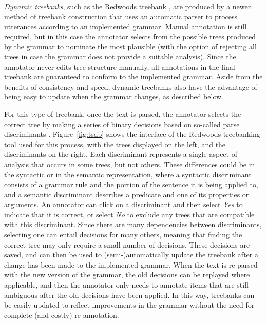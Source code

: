 
\textit{Dynamic treebanks}, such as the Redwoods treebank \citep{Oep:Fli:Tou:04},
are produced by a newer method of treebank construction that uses an automatic
parser to process utterances according to an implemented grammar. Manual
annotation is still required, but in this case the annotator selects from the
possible trees produced by the grammar to nominate the most plausible (with
the option of rejecting all trees in case the grammar does not provide
a suitable analysis). Since the
annotator never edits tree structure manually, all annotations in the final
treebank are guaranteed to conform to the implemented grammar.  Aside from the
benefits of consistency and speed, dynamic treebanks also have the advantage of
being easy to update when the grammar changes, as described below.

For this type of treebank, once the text is parsed, the annotator selects the
correct tree by making a series of binary decisions based on so-called parse
discriminants \citep{Carter:99}.  
Figure~\ref{fig:tsdb} shows the interface of
the Redwoods treebanking tool used for this
process, with the trees displayed on the left, and the discriminants on the
right. Each discriminant represents a single aspect of analysis that occurs in
some trees, but not others. These differences could be in the syntactic or in
the semantic representation, where a syntactic discriminant consists of a
grammar rule and the portion of the sentence it is being applied to, and a
semantic discriminant describes a predicate and one of its properties or
arguments. An annotator can click on a discriminant and then select \textit{Yes}
to indicate that it is correct, or select \textit{No} to exclude any trees that
are compatible with this discriminant. Since there are many dependencies between
discriminants, selecting one can entail decisions for many others, meaning
that finding the correct tree may only require a small number of decisions.
These decisions are saved, and can then be used to (semi-)automatically update
the treebank after a change has been made to the implemented grammar. When the
text is re-parsed with the new version of the grammar, the old decisions can be
replayed where applicable, and then the annotator only needs to annotate items
that are still ambiguous after the old decisions have been applied.  In this
way, treebanks can be easily updated to reflect improvements in the grammar
without the need for complete (and costly) re-annotation.

